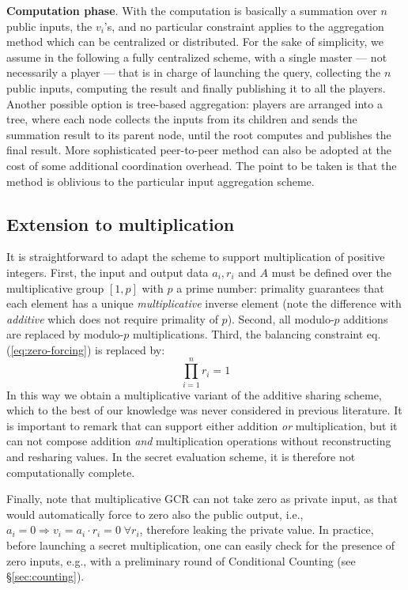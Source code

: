 \documentclass{sig-alternate}
\begin{document}
{\bf Computation phase}.   
With \ata the computation is basically a summation over $n$ public inputs, the $v_i$'s,  and 
no particular constraint applies to the aggregation method which can be centralized or distributed.
For the sake of simplicity,  we assume in the following a fully centralized scheme, with a single master --- not necessarily a player ---  that is in charge of launching the query, collecting the $n$ public inputs, computing the result and finally publishing it to all the players.  
Another possible option is tree-based aggregation:  players are arranged into a tree, where each node collects the inputs from its children and sends the summation result to its parent node, until the root computes and publishes the final result. 
More sophisticated peer-to-peer method can also be adopted at the cost of some additional coordination overhead. 
The point to be taken is that the \ata method is oblivious to the particular input aggregation scheme. 

\subsection{Extension to multiplication} \label{sec:multiplication}
It is straightforward to adapt the \ata scheme to support multiplication of positive integers.
First, the input and output data $a_i, r_i$ and  $A$  must be defined over the multiplicative group  $[1,p]$ with $p$ a prime number:
primality guarantees that each element has a unique {\em multiplicative} inverse element 
(note the difference with {\em additive} \ata which does not require primality of $p$).
Second, all modulo-$p$ additions are replaced by modulo-$p$ multiplications.
Third, the balancing constraint eq.  (\ref{eq:zero-forcing}) is replaced by:
\begin{equation}
\prod_{i=1}^{n}{r_i} = 1 \label{eq:one-forcing}
\end{equation}
In this way we obtain a multiplicative variant of the additive sharing scheme, which to the best of our knowledge was never considered in previous literature. 
It is important to remark that \ata can support either addition {\em or} multiplication, but it can not compose addition {\em and} multiplication operations without reconstructing and resharing values. In the secret evaluation scheme, it is therefore not computationally complete.

Finally, note that multiplicative GCR can not take zero as private input, as that would automatically force to zero also the public output, i.e., $a_i=0 \Rightarrow v_i=a_i \cdot r_i=0 \; \forall r_i$, therefore leaking the private value. In practice,  before launching a secret multiplication, one can easily check for the presence of zero inputs, e.g., with a preliminary  round of Conditional Counting (see \S \ref{sec:counting}).
\end{document}
